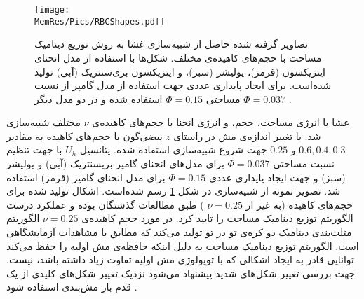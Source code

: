 \begin{figure}[htbp]
\begin{center}
\texttt{[image: \\MemRes/Pics/RBCShapes.pdf]}
\caption{
تصاویر گرفته شده حاصل از شبیه‌سازی غشا به روش توزیع دینامیک مساحت با حجم‌های کاهیده‌ی مختلف. شکل‌ها با استفاده از مدل انحنای ایتزیکسون (قرمز)، یولیشر (سبز)، و ایتزیکسون بری‌سنتریک (آبی) تولید شده‌است. برای ایجاد پایداری عددی جهت استفاده از مدل گامپر از نسبت مساحتی
$\Phi=0.15$
استفاده شده و در دو مدل دیگر 
$\Phi=0.037$
.
}
\label{fig:LiquidShapes}
\end{center}
\end{figure}

غشا با انرژی مساحت، حجم، و انرژی انحنا با حجم‌های کاهیده‌ی 
$\nu$
مختلف شبیه‌سازی شد. با تغییر اندازه‌ی مش در راستای 
$z$
بیضی‌گون با حجم‌های کاهیده به مقادیر
$0.6,0.4,0.3$
و
$0.25$
جهت شروع شبیه‌سازی استفاده شده. پتانسیل 
$U_h$
با جهت تنظیم نسبت مساحتی
$\Phi=0.037$
برای مدل‌های انحنای گامپر-بریسنتریک (آبی) و یولیشر (سبز) و جهت ایجاد پایداری عددی 
$\Phi=0.15$
برای مدل انحنای گامپر (قرمز) استفاده شد. تصویر نمونه از شبیه‌سازی در شکل
\ref{fig:LiquidShapes}
رسم شده‌است. اشکال تولید شده برای حجم‌های کاهیده (به غیر از 
$\nu=0.25$
) طبق مطالعات گذشتگان بوده
\cite{BIAN2020}
و عملکرد درست الگوریتم توزیع دینامیک مساحت را تایید کرد. در مورد حجم کاهیده‌ی 
$\nu=0.25$
الگوریتم مثلث‌بندی دینامیک دو کره‌ی تو در تو تولید می‌کند که مطابق با مشاهدات آزمایشگاهی است. الگوریتم توزیع دینامیک مساحت به دلیل اینکه حافظه‌ی مش اولیه را حفظ می‌کند توانایی قادر به ایجاد اشکالی که با توپولوژی مش اولیه تفاوت زیاد داشته باشد، نیست. جهت بررسی تغییر شکل‌های شدید پیشنهاد می‌شود نزدیک تغییر شکل‌های کلیدی از یک قدم باز مش‌بندی استفاده شود
\cite{Peskin972JourCompPhys, Thomas1979AIAA, Chimera1986,Drabik2016}
. 





